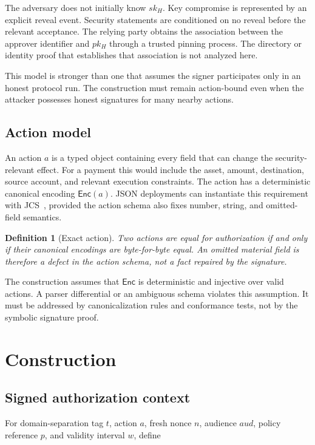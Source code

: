 \documentclass[10.5pt]{article}
\newtheorem{definition}{Definition}
\newcommand{\Enc}{\mathsf{Enc}}
\begin{document}
The adversary does not initially know $sk_H$. Key compromise is represented by an
explicit reveal event. Security statements are conditioned on no reveal before
the relevant acceptance. The relying party obtains the association between the
approver identifier and $pk_H$ through a trusted pinning process. The directory or
identity proof that establishes that association is not analyzed here.

This model is stronger than one that assumes the signer participates only in an
honest protocol run. The construction must remain action-bound even when the
attacker possesses honest signatures for many nearby actions.

\subsection{Action model}

An action $a$ is a typed object containing every field that can change the
security-relevant effect. For a payment this would include the asset, amount,
destination, source account, and relevant execution constraints. The action has
a deterministic canonical encoding $\Enc(a)$. JSON deployments can instantiate
this requirement with JCS~\cite{jcs}, provided the action schema also fixes
number, string, and omitted-field semantics.

\begin{definition}[Exact action]
Two actions are equal for authorization if and only if their canonical encodings
are byte-for-byte equal. An omitted material field is therefore a defect in the
action schema, not a fact repaired by the signature.
\end{definition}

The construction assumes that $\Enc$ is deterministic and injective over valid
actions. A parser differential or an ambiguous schema violates this assumption.
It must be addressed by canonicalization rules and conformance tests, not by the
symbolic signature proof.

\section{Construction}

\subsection{Signed authorization context}

For domain-separation tag $t$, action $a$, fresh nonce $n$, audience $aud$,
policy reference $p$, and validity interval $w$, define
\end{document}
